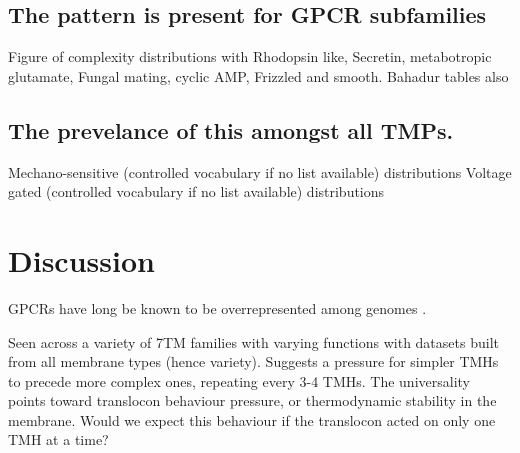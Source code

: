 \subsection{The pattern is present for GPCR subfamilies}
Figure of complexity distributions with Rhodopsin like, Secretin, metabotropic glutamate, Fungal mating, cyclic AMP, Frizzled and smooth.
Bahadur tables also


\subsection{The prevelance of this amongst all TMPs.}
Mechano-sensitive (controlled vocabulary if no list available) distributions
Voltage gated (controlled vocabulary if no list available) distributions


\section{Discussion}
GPCRs have long be known to be overrepresented among genomes \cite{Remm2000}.

Seen across a variety of 7TM families with varying functions with datasets built from all membrane types (hence variety).
Suggests a pressure for simpler TMHs to precede more complex ones, repeating every 3-4 TMHs.
The universality points toward translocon behaviour pressure, or thermodynamic stability in the membrane.
Would we expect this behaviour if the translocon acted on only one TMH at a time?
